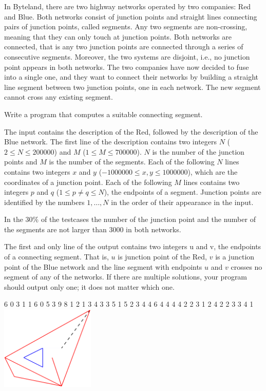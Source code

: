 

In Byteland, there are two highway networks operated by two companies: Red and Blue. Both networks consist of junction points and straight lines connecting pairs of junction points, called segments. Any two segments are non-crossing, meaning that they can only touch at junction points. Both networks are connected, that is any two junction points are connected through a series of consecutive segments. Moreover, the two systems are disjoint, i.e., no junction point appears in both networks.
The two companies have now decided to fuse into a single one, and they want to connect their networks by building a straight line segment between two junction points, one in each network. The new segment cannot cross any existing segment.

Write a program that computes a suitable connecting segment.

The input contains the description of the Red, followed by the description of the Blue network. The first line of the description contains two integers $N$ ($2 \leq N \leq 200000$) and $M$ ($1 \leq M \leq 700000$). $N$ is the number of the junction points and $M$ is the number of the segments. Each of the following $N$ lines contains two integers $x$ and $y$ ($-1000000 \leq x,y \leq 1000000$), which are the coordinates of a junction point. Each of the following $M$ lines contains two integers $p$ and $q$ ($1\leq p \neq q \leq N$), the endpoints of a segment. Junction points are identified by the numbers $1,\ldots,N$ in the order of their appearance in the input.

\bigskip
In the $30\%$ of the testcases the number of the junction point and the number of the segments are not larger than $3 000$ in both networks.

The first and only line of the output contains two integers u and v, the endpoints of a connecting segment. That is, $u$ is junction point of the Red, $v$ is a junction point of the Blue network and the line segment with endpoints $u$ and $v$ crosses no segment of any of the networks. If there are multiple solutions, your program should output only one; it does not matter which one.


 6
0 3
1 1
6 0
5 3
9 8
1 2
1 3
4 3
3 5
1 5
2 3
4 4
6 4
4 4
4 2
2 3
1 2
4 2
2 3
3 4
 1
\sampleCOMMENT
\includegraphics[height=4cm]{img/fig11.pdf}
\sampleEND


